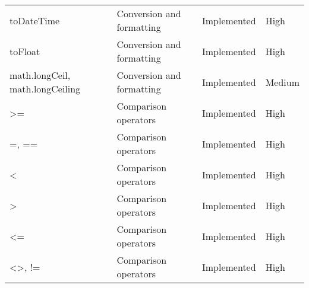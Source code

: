 \begin{longtable}{llll}
toDateTime & Conversion and formatting & Implemented & High \\
toFloat & Conversion and formatting & Implemented & High \\
math.longCeil, math.longCeiling & Conversion and formatting & Implemented & Medium \\
>= & Comparison operators & Implemented & High \\
=, == & Comparison operators & Implemented & High \\
< & Comparison operators & Implemented & High \\
> & Comparison operators & Implemented & High \\
<= & Comparison operators & Implemented & High \\
<>, != & Comparison operators & Implemented & High \\
\end{longtable}
